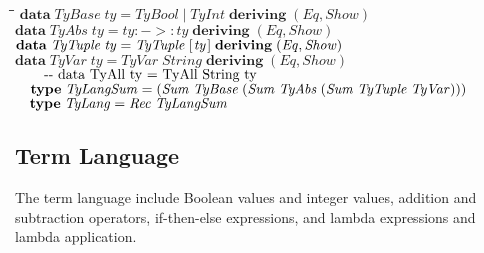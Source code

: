 \documentclass[10pt]{article}
\newlength{\lwidth}\setlength{\lwidth}{4.5cm}
\newlength{\cwidth}\setlength{\cwidth}{8mm} %
\newcommand{\Conid}[1]{\mathit{#1}}
\newcommand{\Varid}[1]{\mathit{#1}}
\begin{document}
\begin{tabbing}
\qquad\=\hspace{\lwidth}\=\hspace{\cwidth}\=\+\kill
${\mathbf{data}\;\Conid{TyBase}\;\Varid{ty}\mathrel{=}\Conid{TyBool}\mid \Conid{TyInt}\;\mathbf{deriving}\;(\Conid{Eq},\Conid{Show})}$\\
${}$\\
${\mathbf{data}\;\Conid{TyAbs}\;\Varid{ty}\mathrel{=}\Varid{ty}\mathbin{:->:}\Varid{ty}\;\mathbf{deriving}\;(\Conid{Eq},\Conid{Show})}$\\
${}$\\
${\mathbf{data}\;\Conid{TyTuple}\;\Varid{ty}\mathrel{=}\Conid{TyTuple}\;[\mskip1.5mu \Varid{ty}\mskip1.5mu]\;\mathbf{deriving}\;(\Conid{Eq},\Conid{Show})}$\\
${}$\\
${\mathbf{data}\;\Conid{TyVar}\;\Varid{ty}\mathrel{=}\Conid{TyVar}\;\Conid{String}\;\mathbf{deriving}\;(\Conid{Eq},\Conid{Show})}$\\
${}$\\
${\mbox{\qquad-{}-   data TyAll ty = TyAll String ty}}$\\
${}$\\
${\hskip1.00em\relax\mathbf{type}\;\Conid{TyLangSum}\mathrel{=}(\Conid{Sum}\;\Conid{TyBase}\;(\Conid{Sum}\;\Conid{TyAbs}\;(\Conid{Sum}\;\Conid{TyTuple}\;\Conid{TyVar})))}$\\
${}$\\
${\hskip1.00em\relax\mathbf{type}\;\Conid{TyLang}\mathrel{=}\Conid{Rec}\;\Conid{TyLangSum}}$
\end{tabbing}
\subsection{Term Language}

The term language include Boolean values and integer values, addition
and subtraction operators, if-then-else expressions, and lambda
expressions and lambda application.
\end{document}
